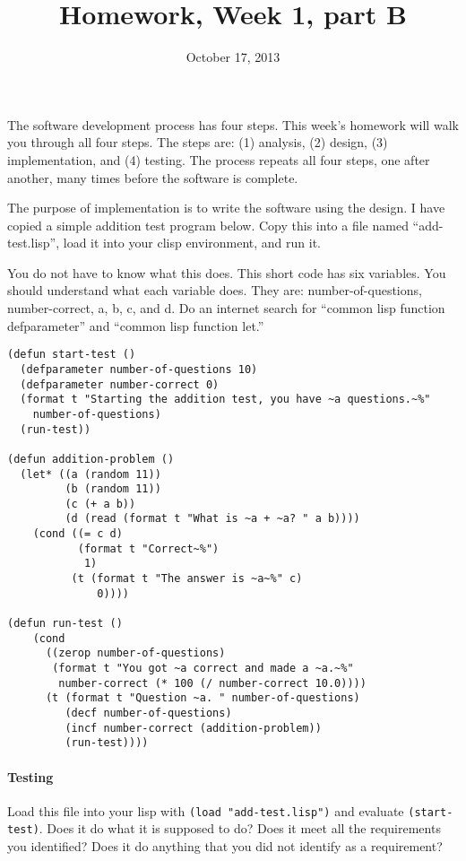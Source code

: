 \documentclass{article}
\title{Homework, Week 1, part B}
\date{October 17, 2013}
\begin{document}
\maketitle{}

The software development process has four steps. This week's homework will walk you through all four steps. The steps are: (1) analysis, (2) design, (3) implementation, and (4) testing. The process repeats all four steps, one after another, many times before the software is complete.

The purpose of implementation is to write the software using the design. I have copied a simple addition test program below. Copy this into a file named ``add-test.lisp'', load it into your clisp environment, and run it.

You do not have to know what this does. This short code has six variables. You should understand what each variable does. They are: number-of-questions, number-correct, a, b, c, and d. Do an internet search for ``common lisp function defparameter'' and ``common lisp function let.''

\lstset{language=Lisp,numbers=left,keepspaces=true,basicstyle=\small,numberstyle=\tiny,showstringspaces=false,breaklines=true}
\begin{lstlisting}
(defun start-test ()
  (defparameter number-of-questions 10)
  (defparameter number-correct 0)
  (format t "Starting the addition test, you have ~a questions.~%" 
    number-of-questions)
  (run-test))

(defun addition-problem ()
  (let* ((a (random 11))
         (b (random 11))
         (c (+ a b))
         (d (read (format t "What is ~a + ~a? " a b))))
    (cond ((= c d)
           (format t "Correct~%")
            1)
          (t (format t "The answer is ~a~%" c)
              0))))

(defun run-test ()
    (cond 
      ((zerop number-of-questions)
       (format t "You got ~a correct and made a ~a.~%" 
        number-correct (* 100 (/ number-correct 10.0))))
      (t (format t "Question ~a. " number-of-questions)
         (decf number-of-questions)
         (incf number-correct (addition-problem))
         (run-test))))
\end{lstlisting}

\paragraph{Testing}Load this file into your lisp with \texttt{(load "add-test.lisp")} and evaluate \texttt{(start-test)}. Does it do what it is supposed to do? Does it meet all the requirements you identified? Does it do anything that you did not identify as a requirement?
\end{document}
